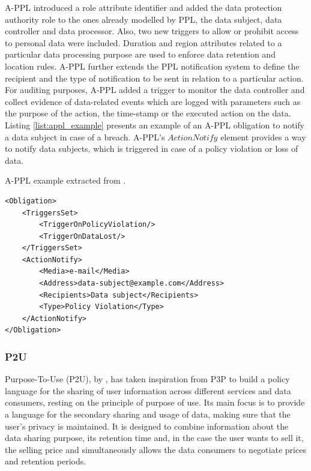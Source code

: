 A-PPL introduced a role attribute identifier and added the data protection authority role to the ones already modelled by PPL, the data subject, data controller and data processor.
Also, two new triggers to allow or prohibit access to personal data were included.
Duration and region attributes related to a particular data processing purpose are used to enforce data retention and location rules.
A-PPL further extends the PPL notification system to define the recipient and the type of notification to be sent in relation to a particular action.
For auditing purposes, A-PPL added a trigger to monitor the data controller and collect evidence of data-related events which are logged with parameters such as the purpose of the action, the time-stamp or the executed action on the data.
Listing \ref{list:appl_example} presents an example of an A-PPL obligation to notify a data subject in case of a breach. A-PPL's $ActionNotify$ element provides a way to notify data subjects, which is triggered in case of a policy violation or loss of data.

\begin{listing}
\caption{A-PPL example extracted from \cite{azraoui_appl_2014}.}
\label{list:appl_example}
\begin{verbatim}
<Obligation>
    <TriggersSet>
        <TriggerOnPolicyViolation/>
        <TriggerOnDataLost/>
    </TriggersSet>
    <ActionNotify>
        <Media>e-mail</Media>
        <Address>data-subject@example.com</Address>
        <Recipients>Data subject</Recipients>
        <Type>Policy Violation</Type>
    </ActionNotify>
</Obligation>
\end{verbatim}
\end{listing}

\subsubsection{P2U}
\label{sec:p2u}

Purpose-To-Use (P2U), by \cite{iyilade_p2u_2014}, has taken inspiration from P3P to build a policy language for the sharing of user information across different services and data consumers, resting on the principle of purpose of use.
Its main focus is to provide a language for the secondary sharing and usage of data, making sure that the user's privacy is maintained.
It is designed to combine information about the data sharing purpose, its retention time and, in the case the user wants to sell it, the selling price and simultaneously allows the data consumers to negotiate prices and retention periods.

